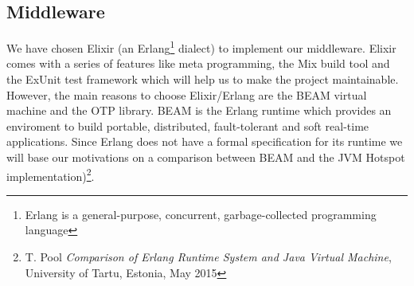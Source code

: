 \subsection{Middleware}
We have chosen Elixir (an Erlang\footnote{Erlang is a general-purpose,
concurrent, garbage-collected programming language} dialect) to implement
our middleware. Elixir comes with a series of features like meta programming,
the Mix build tool and the ExUnit test framework which will help us to make
the project maintainable.
However, the main reasons to choose Elixir/Erlang are the BEAM virtual machine
and the OTP library.
BEAM is the Erlang runtime which provides an enviroment to build portable,
distributed, fault-tolerant and soft real-time applications.
Since Erlang does not have a formal specification for its runtime we will
 base our motivations on a comparison between BEAM and the JVM
Hotspot implementation)\footnote{T. Pool \textit{Comparison of Erlang Runtime
System and Java Virtual Machine}, University of Tartu, Estonia, May 2015}.

